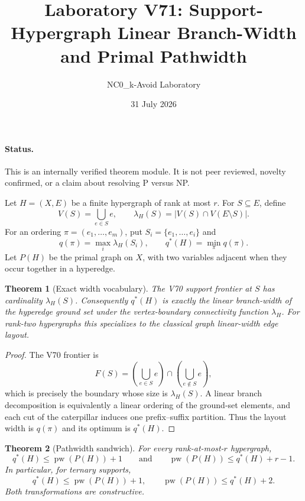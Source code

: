 \documentclass[11pt]{article}
\title{Laboratory V71: Support-Hypergraph Linear Branch-Width and Primal Pathwidth}
\author{NC0\_k-Avoid Laboratory}
\date{31 July 2026}
\newtheorem{theorem}{Theorem}
\newcommand{\pw}{\operatorname{pw}}
\begin{document}
\maketitle

\paragraph{Status.}
This is an internally verified theorem module. It is not peer reviewed, novelty confirmed, or a claim about resolving P versus NP.

Let $H=(X,E)$ be a finite hypergraph of rank at most $r$.  For $S\subseteq E$, define
\[
  V(S)=\bigcup_{e\in S}e,
  \qquad
  \lambda_H(S)=|V(S)\cap V(E\setminus S)|.
\]
For an ordering $\pi=(e_1,\ldots,e_m)$, put $S_i=\{e_1,\ldots,e_i\}$ and
\[
  q(\pi)=\max_i\lambda_H(S_i),
  \qquad
  q^*(H)=\min_\pi q(\pi).
\]
Let $P(H)$ be the primal graph on $X$, with two variables adjacent when they occur together in a hyperedge.

\begin{theorem}[Exact width vocabulary]
The V70 support frontier at $S$ has cardinality $\lambda_H(S)$.  Consequently $q^*(H)$ is exactly the linear branch-width of the hyperedge ground set under the vertex-boundary connectivity function $\lambda_H$.  For rank-two hypergraphs this specializes to the classical graph linear-width edge layout.
\end{theorem}

\begin{proof}
The V70 frontier is
\[
F(S)=\left(\bigcup_{e\in S}e\right)\cap
     \left(\bigcup_{e\notin S}e\right),
\]
which is precisely the boundary whose size is $\lambda_H(S)$.  A linear branch decomposition is equivalently a linear ordering of the ground-set elements, and each cut of the caterpillar induces one prefix--suffix partition.  Thus the layout width is $q(\pi)$ and its optimum is $q^*(H)$.
\end{proof}

\begin{theorem}[Pathwidth sandwich]
For every rank-at-most-$r$ hypergraph,
\[
  q^*(H)\le \pw(P(H))+1
  \qquad\text{and}\qquad
  \pw(P(H))\le q^*(H)+r-1.
\]
In particular, for ternary supports,
\[
  q^*(H)\le \pw(P(H))+1,
  \qquad
  \pw(P(H))\le q^*(H)+2.
\]
Both transformations are constructive.
\end{theorem}
\end{document}
